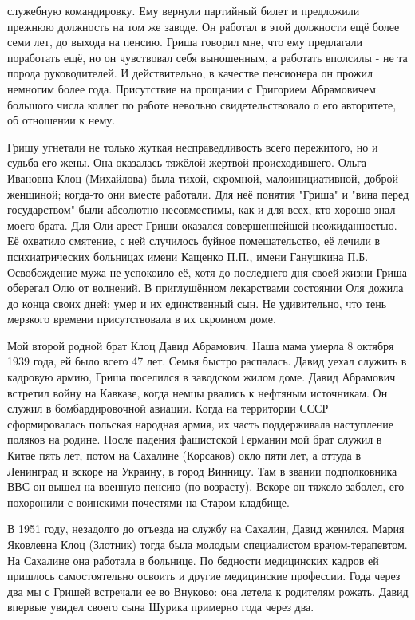 \label{170-1}
служебную командировку. Ему вернули партийный билет и предложили прежнюю должность на том же заводе. Он работал в этой должности ещё более семи лет, до выхода на пенсию. Гриша говорил мне, что ему предлагали поработать ещё, но он чувствовал себя выношенным, а работать вполсилы - не та порода руководителей. И действительно, в качестве пенсионера он прожил немногим более года. Присутствие на прощании с Григорием Абрамовичем большого числа коллег по работе невольно свидетельствовало о его авторитете, об отношении к нему. 

Гришу угнетали не только жуткая несправедливость всего пережитого, но и судьба его жены. Она оказалась тяжёлой жертвой происходившего. Ольга Ивановна Клоц (Михайлова) была тихой, скромной, малоинициативной, доброй женщиной; когда-то они вместе работали. Для неё понятия "Гриша" и "вина перед государством" были абсолютно несовместимы, как и для всех, кто хорошо знал моего брата. Для Оли арест Гриши оказался совершеннейшей неожиданностью. Её охватило смятение, с ней случилось буйное помешательство, её лечили в психиатрических больницах имени Кащенко П.П., имени Ганушкина П.Б. Освобождение мужа не успокоило её, хотя до последнего дня своей жизни Гриша оберегал Олю от волнений. В приглушённом лекарствами состоянии Оля дожила до конца своих дней; умер и их единственный сын. Не удивительно, что тень мерзкого времени присутствовала в их скромном доме.

\label{171-1}
Мой второй родной брат Клоц Давид Абрамович. Наша мама умерла 8 октября 1939 года, ей было всего 47 лет. Семья быстро распалась. Давид уехал служить в кадровую армию, Гриша поселился в заводском жилом доме. Давид Абрамович встретил войну на Кавказе, когда немцы рвались к нефтяным источникам. Он служил в бомбардировочной авиации. Когда на территории СССР сформировалась польская народная армия, их часть поддерживала наступление поляков на родине. После падения фашистской Германии мой брат служил в Китае пять лет, потом на Сахалине (Корсаков) окло пяти лет, а оттуда в Ленинград и вскоре на Украину, в город Винницу. Там в звании подполковника ВВС он вышел на военную пенсию (по возрасту). Вскоре он тяжело заболел, его похоронили с воинскими почестями на Старом кладбище.

В 1951 году, незадолго до отъезда на службу на Сахалин, Давид женился. Мария Яковлевна Клоц (Злотник) тогда была молодым специалистом врачом-терапевтом. На Сахалине она работала в больнице. По бедности медицинских кадров ей пришлось самостоятельно освоить и другие медицинские профессии. Года через два мы с Гришей встречали ее во Внуково: она летела к родителям рожать. Давид впервые увидел своего сына Шурика примерно года через два.


